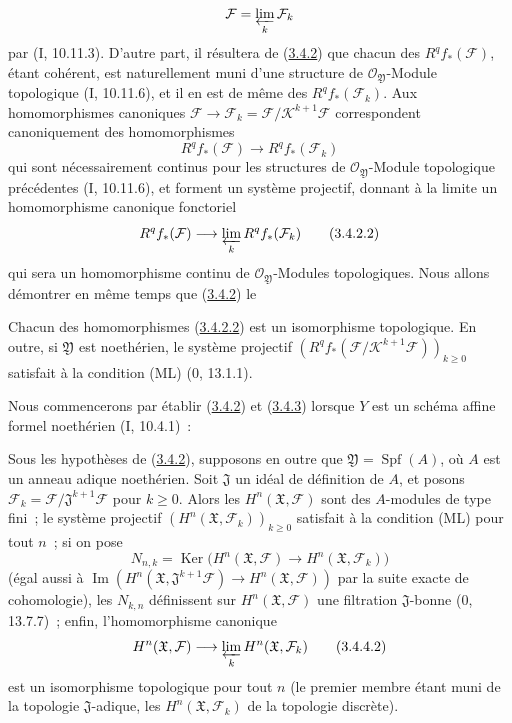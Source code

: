 \[
\mathcal F=\varprojlim_k\mathcal F_k
\]
par (I, 10.11.3). D'autre part, il résultera de
(\hyperref[III.3.4.2-fr]{3.4.2}) que chacun des $R^qf_*(\mathcal F)$, étant
cohérent, est naturellement muni d'une structure de
$\mathcal O_{\mathfrak Y}$-Module topologique (I, 10.11.6), et il en est de
même des $R^qf_*(\mathcal F_k)$. Aux homomorphismes canoniques
$\mathcal F\to\mathcal F_k=\mathcal F/\mathcal K^{k+1}\mathcal F$
correspondent canoniquement des homomorphismes
\[
R^qf_*(\mathcal F)\longrightarrow R^qf_*(\mathcal F_k)
\]
qui sont nécessairement continus pour les structures de
$\mathcal O_{\mathfrak Y}$-Module topologique précédentes (I, 10.11.6), et
forment un système projectif, donnant à la limite un homomorphisme canonique
fonctoriel
\[
R^qf_*(\mathcal F)\longrightarrow\varprojlim_kR^qf_*(\mathcal F_k)
\tag{3.4.2.2}\label{III.3.4.2.2-fr}
\]
qui sera un homomorphisme continu de $\mathcal O_{\mathfrak Y}$-Modules
topologiques. Nous allons démontrer en même temps que
(\hyperref[III.3.4.2-fr]{3.4.2}) le

\begin{corollary}[3.4.3]
\label{III.3.4.3-fr}
Chacun des homomorphismes (\hyperref[III.3.4.2.2-fr]{3.4.2.2}) est un
isomorphisme topologique. En outre, si $\mathfrak Y$ est noethérien, le
système projectif
$(R^qf_*(\mathcal F/\mathcal K^{k+1}\mathcal F))_{k\geq0}$ satisfait à la
condition (ML) (0, 13.1.1).
\end{corollary}

Nous commencerons par établir (\hyperref[III.3.4.2-fr]{3.4.2}) et
(\hyperref[III.3.4.3-fr]{3.4.3}) lorsque $Y$ est un schéma affine
formel noethérien (I, 10.4.1)~:

\begin{corollary}[3.4.4]
\label{III.3.4.4-fr}
Sous les hypothèses de (\hyperref[III.3.4.2-fr]{3.4.2}), supposons en outre
que $\mathfrak Y=\operatorname{Spf}(A)$, où $A$ est un anneau adique
noethérien. Soit $\mathfrak J$ un idéal de définition de $A$, et posons
$\mathcal F_k=\mathcal F/\mathfrak J^{k+1}\mathcal F$ pour $k\geq0$. Alors
les $H^n(\mathfrak X,\mathcal F)$ sont des $A$-modules de type fini~; le
système projectif $(H^n(\mathfrak X,\mathcal F_k))_{k\geq0}$ satisfait à la
condition (ML) pour tout $n$~; si on pose
\[
N_{n,k}=\operatorname{Ker}\bigl(H^n(\mathfrak X,\mathcal F)
\longrightarrow H^n(\mathfrak X,\mathcal F_k)\bigr)
\tag{3.4.4.1}\label{III.3.4.4.1-fr}
\]
(égal aussi à
$\operatorname{Im}(H^n(\mathfrak X,\mathfrak J^{k+1}\mathcal F)
\to H^n(\mathfrak X,\mathcal F))$ par la suite exacte de cohomologie), les
$N_{k,n}$ définissent sur $H^n(\mathfrak X,\mathcal F)$ une filtration
$\mathfrak J$-bonne (0, 13.7.7)~; enfin, l'homomorphisme canonique
\[
H^n(\mathfrak X,\mathcal F)
\longrightarrow\varprojlim_kH^n(\mathfrak X,\mathcal F_k)
\tag{3.4.4.2}\label{III.3.4.4.2-fr}
\]
est un isomorphisme topologique pour tout $n$ (le premier membre étant muni
de la topologie $\mathfrak J$-adique, les $H^n(\mathfrak X,\mathcal F_k)$ de
la topologie discrète).
\end{corollary}


